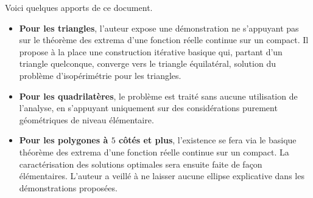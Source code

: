 Voici quelques apports de ce document.

\begin{itemize}
    \item \textbf{Pour les triangles}, l'auteur expose une démonstration ne s'appuyant pas sur le théorème des extrema d'une fonction réelle continue sur un compact. 
    Il propose à la place une construction itérative basique qui, partant d'un triangle quelconque, converge vers le triangle équilatéral, solution du problème d'isopérimétrie pour les triangles.
    
    \item \textbf{Pour les quadrilatères}, le problème est traité sans aucune utilisation de l'analyse, en s'appuyant uniquement sur des considérations purement géométriques de niveau élémentaire.

    \item \textbf{\boldmath Pour les polygones à $5$ côtés et plus}, l'existence se fera via le basique théorème des extrema d'une fonction réelle continue sur un compact. La caractérisation des solutions optimales sera ensuite faite de façon élémentaires.
    L'auteur a veillé à ne laisser aucune ellipse explicative dans les démonstrations proposées.
\end{itemize}
